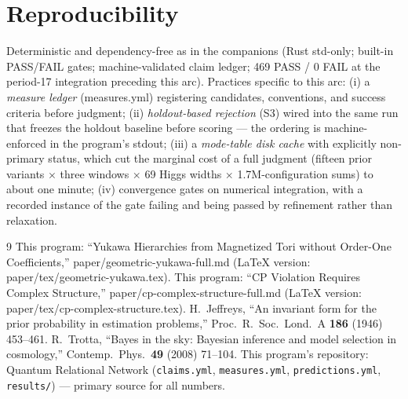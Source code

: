 \documentclass[aps,prd,preprint,nofootinbib]{revtex4-2}
\begin{document}
\section{Reproducibility}

Deterministic and dependency-free as in the companions (Rust std-only; built-in
PASS/FAIL gates; machine-validated claim ledger; 469 PASS / 0 FAIL at the
period-17 integration preceding this arc). Practices specific to this arc: (i)
a \emph{measure ledger} (measures.yml) registering candidates, conventions, and
success criteria before judgment; (ii) \emph{holdout-based rejection} (S3)
wired into the same run that freezes the holdout baseline before scoring ---
the ordering is machine-enforced in the program's stdout; (iii) a
\emph{mode-table disk cache} with explicitly non-primary status, which cut the
marginal cost of a full judgment (fifteen prior variants $\times$ three windows
$\times$ 69 Higgs widths $\times$ 1.7M-configuration sums) to about one minute;
(iv) convergence gates on numerical integration, with a recorded instance of
the gate failing and being passed by refinement rather than relaxation.

\begin{thebibliography}{9}
 This program: ``Yukawa Hierarchies from Magnetized Tori without Order-One Coefficients,'' paper/geometric-yukawa-full.md (LaTeX version: paper/tex/geometric-yukawa.tex).
 This program: ``CP Violation Requires Complex Structure,'' paper/cp-complex-structure-full.md (LaTeX version: paper/tex/cp-complex-structure.tex).
 H.~Jeffreys, ``An invariant form for the prior probability in estimation problems,'' Proc.\ R.\ Soc.\ Lond.\ A \textbf{186} (1946) 453--461.
 R.~Trotta, ``Bayes in the sky: Bayesian inference and model selection in cosmology,'' Contemp.\ Phys.\ \textbf{49} (2008) 71--104.
 This program's repository: Quantum Relational Network (\texttt{claims.yml}, \texttt{measures.yml}, \texttt{predictions.yml}, \texttt{results/}) --- primary source for all numbers.
\end{thebibliography}
\end{document}

